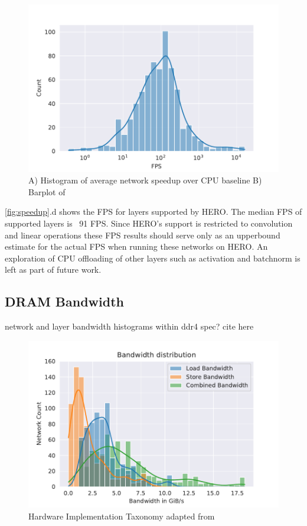 \begin{figure}
    \hspace{0.1cm} 
    \includegraphics[scale=0.46]{Plots/latency/fps.pdf}
    \caption{A) Histogram of average network speedup over CPU baseline B) Barplot of }
    \label{fig:speedup}
\end{figure}

\autoref{fig:speedup}.d  shows the FPS for layers supported by HERO. The median FPS
of supported layers is ~91 FPS. Since HERO's support is restricted to
convolution and linear operations these FPS results should serve only as an
upperbound estimate for the actual FPS when running these networks on HERO. An
exploration of CPU offloading of other layers such as activation and batchnorm
is left as part of future work.  

\subsection{DRAM Bandwidth}
\label{chap:hero:sim_platform:cigar_side}

network and layer bandwidth histograms
within ddr4 spec? cite here

\begin{figure}[ht]
    \centering
    \includegraphics[scale=0.58]{Plots/resources/net_bw.pdf}
    \caption{Hardware Implementation Taxonomy adapted from \cite{maestro}}
    \label{fig:dram_bw}
\end{figure}


